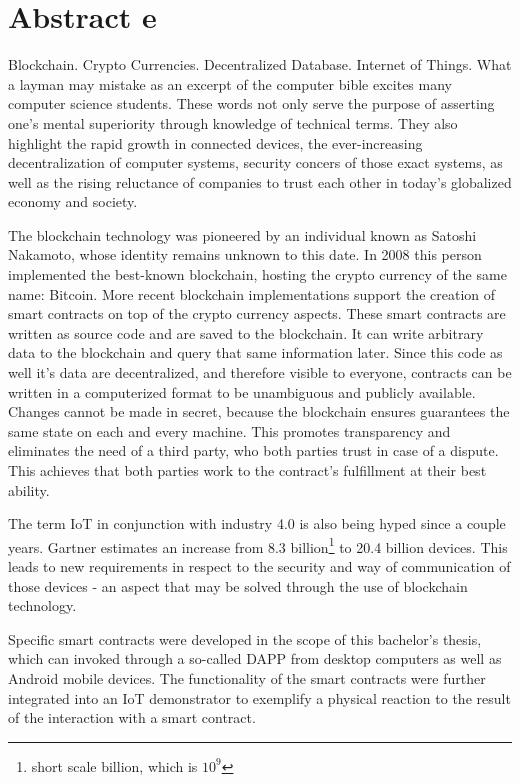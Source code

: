 \chapter{Abstract e}
\label{cha:abstract_e}

Blockchain. Crypto Currencies. Decentralized Database. Internet of Things. What a layman may mistake as an excerpt of the computer bible excites many computer science students. These words not only serve the purpose of asserting one's mental superiority through knowledge of technical terms. They also highlight the rapid growth in connected devices, the ever-increasing decentralization of computer systems, security concers of those exact systems, as well as the rising reluctance of companies to trust each other in today's globalized economy and society.

The blockchain technology was pioneered by an individual known as Satoshi Nakamoto, whose identity remains unknown to this date. In 2008 this person implemented the best-known blockchain, hosting the crypto currency of the same name: Bitcoin. More recent blockchain implementations support the creation of smart contracts on top of the crypto currency aspects. These smart contracts are written as source code and are saved to the blockchain. It can write arbitrary data to the blockchain and query that same information later. Since this code as well it's data are decentralized, and therefore visible to everyone, contracts can be written in a computerized format to be unambiguous and publicly available. Changes cannot be made in secret, because the blockchain ensures guarantees the same state on each and every machine. This promotes transparency and eliminates the need of a third party, who both parties trust in case of a dispute. This achieves that both parties work to the contract's fulfillment at their best ability.

The term \acrshort{IoT} in conjunction with industry 4.0 is also being hyped since a couple years. Gartner estimates an increase from 8.3 billion\footnote{short scale billion, which is $10^{9}$} to 20.4 billion devices. This leads to new requirements in respect to the security and way of communication of those devices - an aspect that may be solved through the use of blockchain technology.\cite{gartner.com_iot,BlockchainRevolution}

Specific smart contracts were developed in the scope of this bachelor's thesis, which can invoked through a so-called \acrfull{DAPP} from desktop computers as well as Android mobile devices. The functionality of the smart contracts were further integrated into an IoT demonstrator to exemplify a physical reaction to the result of the interaction with a smart contract.